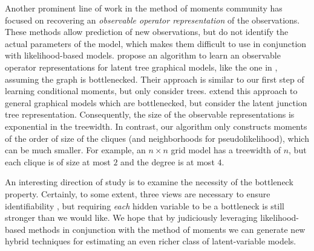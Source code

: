 Another prominent line of work in the method of moments community has
  focused on recovering an {\em observable operator
  representation} of the observations.
  These methods allow prediction of new observations, but do not
  identify the actual parameters of the model, which makes them difficult to use
  in conjunction with likelihood-based models. %
\citet{song2011spectral} propose an algorithm to learn an observable
  operator representations for latent tree graphical models, like the
  one in , assuming the graph is bottlenecked. 
Their approach is similar to our first step of learning conditional moments,
  but only consider trees.
\citet{parikh12spectral} extend this approach to general graphical
  models which are bottlenecked, but consider the latent
  junction tree representation. 
  Consequently, the size of the observable representations is exponential in
  the treewidth.
  In contrast, our algorithm only constructs moments of the order of size of the cliques
  (and neighborhoods for pseudolikelihood), which can be much smaller.
For example, an $n\times n$ grid model has a treewidth of $n$, but each
  clique is of size at most $2$ and the degree is at most $4$.

An interesting direction of study is to examine the necessity of the bottleneck
property.  Certainly, to some extent, three views are necessary to ensure
identifiability \cite{kruskal77three}, but requiring \emph{each} hidden variable to be
a bottleneck is still stronger than we would like.  We hope that by judiciously
leveraging likelihood-based methods in conjunction with the method of moments
we can generate new hybrid techniques for estimating
an even richer class of latent-variable models.
